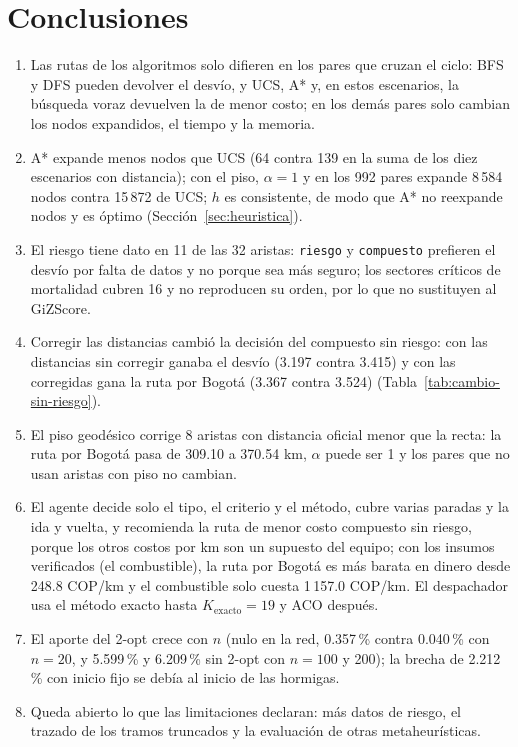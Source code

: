 \documentclass[12pt,a4paper]{article}
\begin{document}
\section{Conclusiones}

\begin{enumerate}
\item Las rutas de los algoritmos solo difieren en los pares que cruzan el
ciclo: BFS y DFS pueden devolver el desvío, y UCS, A* y, en estos escenarios,
la búsqueda voraz devuelven la de menor costo; en los demás pares solo cambian
los nodos expandidos, el tiempo y la memoria.
\item A* expande menos nodos que UCS (64 contra 139 en la suma de los diez
escenarios con distancia); con el piso, $\alpha = 1$ y en los 992 pares expande
8\,584 nodos contra 15\,872 de UCS; $h$ es consistente, de modo que A* no reexpande
nodos y es óptimo (Sección~\ref{sec:heuristica}).
\item El riesgo tiene dato en 11 de las 32 aristas: \texttt{riesgo} y
\texttt{compuesto} prefieren el desvío por falta de datos y no porque sea más
seguro; los sectores críticos de mortalidad cubren 16 y no reproducen su
orden, por lo que no sustituyen al GiZScore.
\item Corregir las distancias cambió la decisión del compuesto sin riesgo:
con las distancias sin corregir ganaba el desvío (3.197 contra 3.415) y con
las corregidas gana la ruta por Bogotá (3.367 contra 3.524)
(Tabla~\ref{tab:cambio-sin-riesgo}).
\item El piso geodésico corrige 8 aristas con distancia oficial menor que la
recta: la ruta por Bogotá pasa de 309.10 a 370.54 km, $\alpha$ puede ser 1 y
los pares que no usan aristas con piso no cambian.
\item El agente decide solo el tipo, el criterio y el método, cubre varias
paradas y la ida y vuelta, y recomienda la ruta de menor costo compuesto sin
riesgo, porque los otros costos por km son un supuesto del equipo; con los
insumos verificados (el combustible), la ruta por Bogotá es más barata en
dinero desde 248.8 COP/km y el
combustible solo cuesta 1\,157.0 COP/km. El
despachador usa el método exacto hasta $K_{\mathrm{exacto}} = 19$ y ACO
después.
\item El aporte del 2-opt crece con $n$ (nulo en la red, 0.357\,\% contra
0.040\,\% con $n = 20$, y 5.599\,\% y 6.209\,\% sin 2-opt con $n = 100$ y
200); la brecha de 2.212\,\% con inicio fijo se debía al inicio de las
hormigas.
\item Queda abierto lo que las limitaciones declaran: más datos de riesgo, el
trazado de los tramos truncados y la evaluación de otras metaheurísticas.
\end{enumerate}
\end{document}
